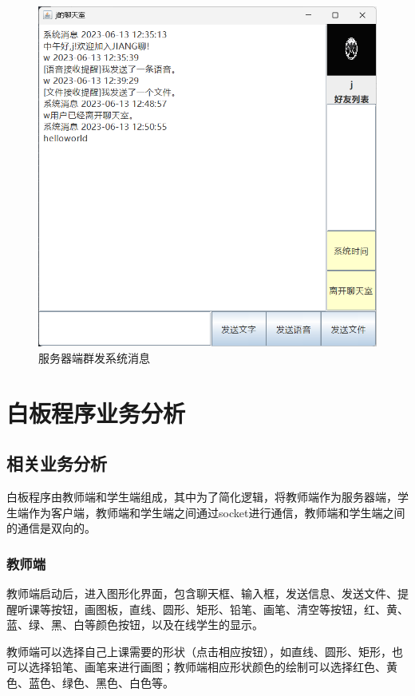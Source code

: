 \documentclass[UTF8,12pt]{article}
\begin{document}
\begin{figure}[htbp]
\begin{minipage}{0.4\textwidth}
        \includegraphics[width=1.0\textwidth]{img/28.png}
    \end{minipage}
    \caption{服务器端群发系统消息}
\end{figure}


\newpage

\section{白板程序业务分析}
\subsection{相关业务分析}
白板程序由教师端和学生端组成，其中为了简化逻辑，将教师端作为服务器端，学生端作为客户端，教师端和学生端之间通过socket进行通信，教师端和学生端之间的通信是双向的。
\subsubsection{教师端}
教师端启动后，进入图形化界面，包含聊天框、输入框，发送信息、发送文件、提醒听课等按钮，画图板，直线、圆形、矩形、铅笔、画笔、清空等按钮，红、黄、蓝、绿、黑、白等颜色按钮，以及在线学生的显示。

教师端可以选择自己上课需要的形状（点击相应按钮），如直线、圆形、矩形，也可以选择铅笔、画笔来进行画图；教师端相应形状颜色的绘制可以选择红色、黄色、蓝色、绿色、黑色、白色等。
\end{document}
